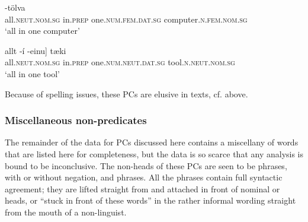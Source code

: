 \documentclass[output=paper]{LSP/langsci}
\begin{document}
\begin{xlist}
\ea%
 \label{ex:bjarnadottir:26} 
 \ea \label{ex:bjarnadottir:26a} 
  -tölva\\
 all\textsc{.neut.nom.sg} in\textsc{.prep} one\textsc{.num.fem.dat.sg} computer\textsc{.n.fem.nom.sg}\\
\glt ‘all in one computer’

\ex \label{ex:bjarnadottir:26b} 
\gll {\ob}allt -í  -einu] tæki\\
 all\textsc{.neut.nom.sg} in\textsc{.prep} one\textsc{.num.neut.dat.sg} tool\textsc{.n.neut.nom.sg}\\
\glt ‘all in one tool’
\z
\z

Because of spelling issues, these PCs are elusive in texts, cf.  above.

\subsubsection{Miscellaneous non-predicates}\label{sec:bjarnadottir:3.2.2}

The remainder of the data for PCs discussed here contains a miscellany of words that are listed here for completeness, but the data is so scarce that any analysis is bound to be inconclusive. The non-heads of these PCs are seen to be  phrases, with or without negation, and  phrases. All the phrases contain full syntactic agreement; they are lifted straight from  and attached in front of nominal or  heads, or “stuck in front of these words” in the rather informal wording straight from the mouth of a non-linguist.



\end{xlist}
\end{document}
